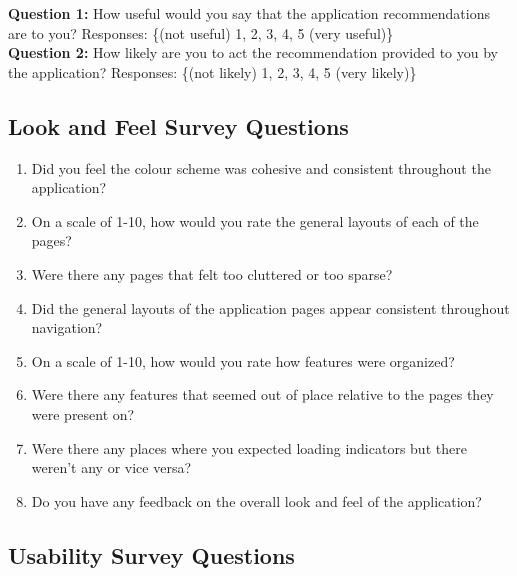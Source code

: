 \documentclass[12pt, titlepage]{article}
\begin{document}
\noindent \textbf{Question 1:} How useful would you say that the application recommendations are to you?
Responses: \{(not useful) 1, 2, 3, 4, 5 (very useful)\} \\

\noindent \textbf{Question 2:} How likely are you to act the recommendation provided to you by the application?
Responses: \{(not likely) 1, 2, 3, 4, 5 (very likely)\}

\subsection{Look and Feel Survey Questions}

\begin{enumerate}
  \item Did you feel the colour scheme was cohesive and consistent throughout the application?
  \item On a scale of 1-10, how would you rate the general layouts of each of the pages?
  \item Were there any pages that felt too cluttered or too sparse?
  \item Did the general layouts of the application pages appear consistent throughout navigation?
  \item On a scale of 1-10, how would you rate how features were organized?
  \item Were there any features that seemed out of place relative to the pages they were present on?
  \item Were there any places where you expected loading indicators but there weren't any or vice versa?
  \item Do you have any feedback on the overall look and feel of the application?
\end{enumerate}

\subsection{Usability Survey Questions}
\end{document}
